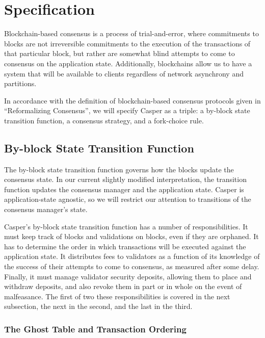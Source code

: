 \documentclass[11pt,a4paper]{article}
\begin{document}
\section{Specification}

Blockchain-based consensus is a process of trial-and-error, where commitments to blocks are not irreversible commitments to the execution of the transactions of that particular block, but rather are somewhat blind attempts to come to consensus on the application state. Additionally, blockchains allow us to have a system that will be available to clients regardless of network asynchrony and partitions.

In accordance with the definition of blockchain-based consensus protocols given in ``Reformalizing Consensus''\cite{ReformalizingConsensus}, we will specify Casper as a triple: a by-block state transition function, a consensus strategy, and a fork-choice rule.


\subsection{By-block State Transition Function}

The by-block state transition function governs how the blocks update the consensus state. In our current slightly modified interpretation, the transition function updates the consensus manager and the application state. Casper is application-state agnostic, so we will restrict our attention to transitions of the consensus manager's state. 

Casper's by-block state transition function has a number of responsibilities. It must keep track of blocks and validations on blocks, even if they are orphaned. It has to determine the order in which transactions will be executed against the application state. It distributes fees to validators as a function of its knowledge of the success of their attempts to come to consensus, as measured after some delay. Finally, it must manage validator security deposits, allowing them to place and withdraw deposits, and also revoke them in part or in whole on the event of malfeasance. The first of two these responsibilities is covered in the next subsection, the next in the second, and the last in the third.


\subsubsection{The Ghost Table and Transaction Ordering}
\end{document}
